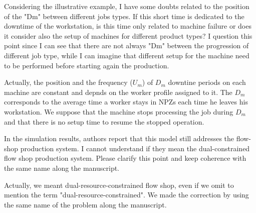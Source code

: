 \documentclass[preprint,11pt,3p]{elsarticle}
\begin{document}
\begin{tcolorbox}[colback=q_color1,colframe=q_color2,title=Q11 :]	
    Considering the illustrative example, I have some doubts related to the position of the "Dm" between different jobs types. If this short time is dedicated to the downtime of the workstation, is this time only related to machine failure or does it consider also the setup of machines for different product types? I question this point since I can see that there are not always "Dm" between the progression of different job type, while I can imagine that different setup for the machine need to be performed before starting again the production.
\end{tcolorbox}
\begin{tcolorbox}[colback=r_color1,colframe=r_color2,title=Response Q11  :]
    Actually, the position and the frequency ($U_m$) of $D_m$ downtine periods on each machine are constant and depnds on the worker profile assigned to it. The $D_m$ corresponds to the average time a worker stays in NPZs each time he leaves his workstation. We suppose that the machine stops processing the job during $D_m$ and that there is no setup time to resume the stopped operation.
\end{tcolorbox}

\begin{tcolorbox}[colback=q_color1,colframe=q_color2,title=Q12  :]	
	In the simulation results, authors report that this model still addresses the flow-shop production system. I cannot understand if they mean the dual-constrained flow shop production system. Please clarify this point and keep coherence with the same name along the manuscript.
\end{tcolorbox}

\begin{tcolorbox}[colback=r_color1,colframe=r_color2,title=Response Q12  :]
	Actually, we meant dual-resource-constrained flow shop, even if we omit to mention the term "dual-resource-constrained".  
	We made the correction by using the same name of the problem along the manuscript.
\end{tcolorbox}
\end{document}
